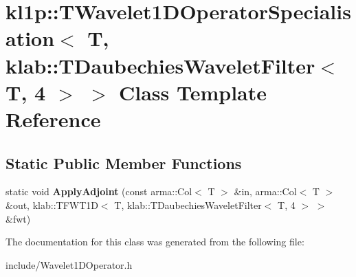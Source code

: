 \hypertarget{classkl1p_1_1TWavelet1DOperatorSpecialisation_3_01T_00_01klab_1_1TDaubechiesWaveletFilter_3_01T_00_014_01_4_01_4}{}\section{kl1p\+:\+:T\+Wavelet1\+D\+Operator\+Specialisation$<$ T, klab\+:\+:T\+Daubechies\+Wavelet\+Filter$<$ T, 4 $>$ $>$ Class Template Reference}
\label{classkl1p_1_1TWavelet1DOperatorSpecialisation_3_01T_00_01klab_1_1TDaubechiesWaveletFilter_3_01T_00_014_01_4_01_4}
\subsection*{Static Public Member Functions}
\begin{DoxyCompactItemize}
\item 
static void {\bfseries Apply\+Adjoint} (const arma\+::\+Col$<$ T $>$ \&in, arma\+::\+Col$<$ T $>$ \&out, klab\+::\+T\+F\+W\+T1D$<$ T, klab\+::\+T\+Daubechies\+Wavelet\+Filter$<$ T, 4 $>$ $>$ \&fwt)\hypertarget{classkl1p_1_1TWavelet1DOperatorSpecialisation_3_01T_00_01klab_1_1TDaubechiesWaveletFilter_3_01T_00_014_01_4_01_4_af5e9c96f4be450e057588c27d40e6d7c}{}\label{classkl1p_1_1TWavelet1DOperatorSpecialisation_3_01T_00_01klab_1_1TDaubechiesWaveletFilter_3_01T_00_014_01_4_01_4_af5e9c96f4be450e057588c27d40e6d7c}

\end{DoxyCompactItemize}


The documentation for this class was generated from the following file\+:\begin{DoxyCompactItemize}
\item 
include/Wavelet1\+D\+Operator.\+h\end{DoxyCompactItemize}
